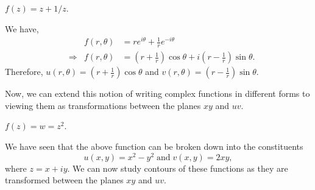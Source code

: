 \documentclass[12pt]{book}
\begin{document}
\begin{exmp}
    $f(z) = z + 1 / z.$
\end{exmp}
We have,
\begin{align*}
    &&f(r, \theta) 
        &= re^{i\theta} + \frac{1}{r}e^{-i\theta}\\
    &\Rightarrow &f(r, \theta)
        &= \left(r + \frac{1}{r}\right)\cos\theta + i\left(r - \frac{1}{r}\right)\sin\theta.
\end{align*}
Therefore, $u(r, \theta) = \left(r + \frac{1}{r}\right)\cos\theta$ and $v(r, \theta) = \left(r - \frac{1}{r}\right)\sin\theta.$

Now, we can extend this notion of writing complex functions in different forms to viewing them as transformations between the planes $xy$ and $uv$. 

\begin{exmp}
    $f(z) = w = z^2.$
\end{exmp}
We have seen that the above function can be broken down into the constituents
$$
    u(x, y) = x^2 - y^2\; \text{and}\; v(x, y) = 2xy,
$$
where $z = x + iy.$ We can now study contours of these functions as they are transformed between the planes $xy$ and $uv$.
\end{document}
